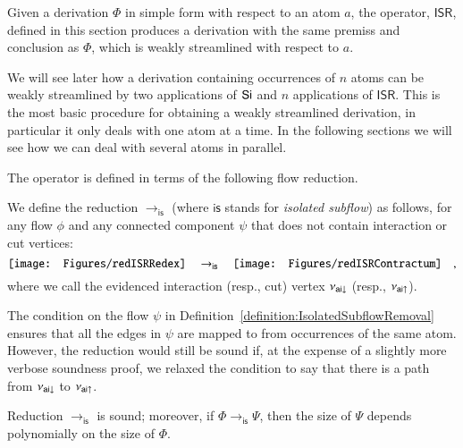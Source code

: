 \newcommand{\ISR}{\mathsf{ISR}}

Given a derivation $\Phi$ in simple form with respect to an atom $a$, the operator, $\ISR$, defined in this section produces a derivation with the same premiss and conclusion as $\Phi$, which is weakly streamlined with respect to $a$.

We will see later how a derivation containing occurrences of $n$ atoms can be weakly streamlined by two applications of $\mathsf{Si}$ and $n$ applications of $\ISR$. This is the most basic procedure for obtaining a weakly streamlined derivation, in particular it only deals with one atom at a time. In the following sections we will see how we can deal with several atoms in parallel.

The operator is defined in terms of the following flow reduction.

\newcommand{\fris}{{\mathsf{is}}}
\begin{definition}\label{definition:IsolatedSubflowRemoval}
We define the reduction $\to_\fris$ (where $\fris$ stands for \emph{isolated subflow}) as follows, for any flow $\phi$ and any connected component $\psi$ that does not contain interaction or cut vertices:
\[
\vcenter{\hbox{\texttt{[image: Figures/redISRRedex]}}}
\quad\to_\fris\quad
\vcenter{\hbox{\texttt{[image: Figures/redISRContractum]}}}
\quad,
\]
where we call the evidenced interaction (resp., cut) vertex $\nu_{{\mathsf{ai}}{\downarrow}}$ (resp., $\nu_{{\mathsf{ai}}{\uparrow}}$).
\end{definition}

\begin{remark}\label{remark:IsolatedSubflowRemovalRestriction}
The condition on the flow $\psi$ in Definition~\vref{definition:IsolatedSubflowRemoval} ensures that all the edges in $\psi$ are mapped to from occurrences of the same atom. However, the reduction would still be sound if, at the expense of a slightly more verbose soundness proof, we relaxed the condition to say that there is a path from $\nu_{{\mathsf{ai}}{\downarrow}}$ to $\nu_{{\mathsf{ai}}{\uparrow}}$.
\end{remark}

\begin{theorem}\label{theorem:SoundIsolatedSubflowRemoval}
Reduction\/ $\to_\fris$ is sound; moreover, if\/ $\Phi\to_\fris\Psi$, then the size of\/ $\Psi$ depends  polynomially on the size of\/ $\Phi$.
\end{theorem}

